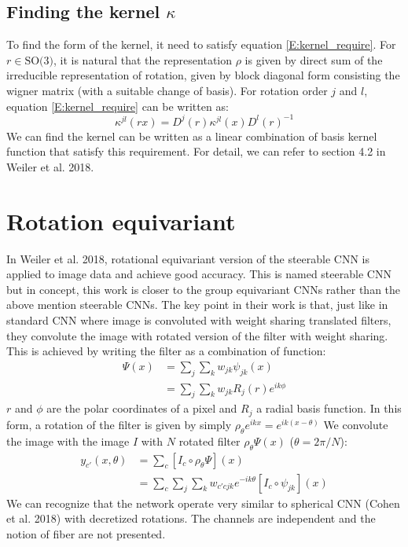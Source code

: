 \documentclass{article}
\begin{document}
\subsection*{Finding the kernel $\kappa$}
To find the form of the kernel, it need to satisfy equation \ref{E:kernel_require}. For $r \in \text{SO(3)}$, 
it is natural that the representation $\rho$ is given by direct sum of the irreducible representation of rotation,
given by block diagonal form consisting the wigner matrix (with a suitable change of basis). 
For rotation order $j$ and $l$, equation \ref{E:kernel_require}
can be written as:
\begin{equation}
    \kappa^{jl}(rx) = D^{j}(r) \kappa^{jl}(x) D^l(r)^{-1}
\end{equation}
We can find the kernel can be written as a linear combination of basis kernel function that satisfy this requirement. 
For detail, we can refer to section 4.2 in Weiler et al. 2018.

\section*{Rotation equivariant}
In Weiler et al. 2018, rotational equivariant version of the steerable CNN is applied to image data and achieve good accuracy. 
This is named steerable CNN but in concept, this work is closer to the group equivariant CNNs rather than the above mention steerable CNNs. 
The key point in their work is that, just like in standard CNN where image is convoluted with weight sharing translated filters, 
they convolute the image with rotated version of the filter with weight sharing. 
This is achieved by writing the filter as a combination of function:
\begin{align*}
    \Psi(x) &= \sum_j \sum_k w_{jk}\psi_{jk}(x) \\
            &= \sum_j \sum_k w_{jk} R_j(r) e^{ik\phi}
\end{align*}
$r$ and $\phi$ are the polar coordinates of a pixel and $R_j$ a radial basis function. In this form, a rotation 
of the filter is given by simply $\rho_{\theta}e^{ikx} = e^{ik(x-\theta)}$
We convolute the image with the image $I$ with $N$ rotated filter $\rho_{\theta}\Psi(x)$ ($\theta = 2\pi / N$):
\begin{align*}
    y_{c'}(x,\theta) &= \sum_c [ I_c \circ \rho_{\theta}\Psi ] (x) \\
        &= \sum_c \sum_j \sum_k w_{c'cjk} e^{-ik\theta} [I_c \circ \psi_{jk}](x)
\end{align*}
We can recognize that the network operate 
very similar to spherical CNN (Cohen et al. 2018) with decretized rotations. The channels are independent and the notion of fiber 
are not presented.
\end{document}
